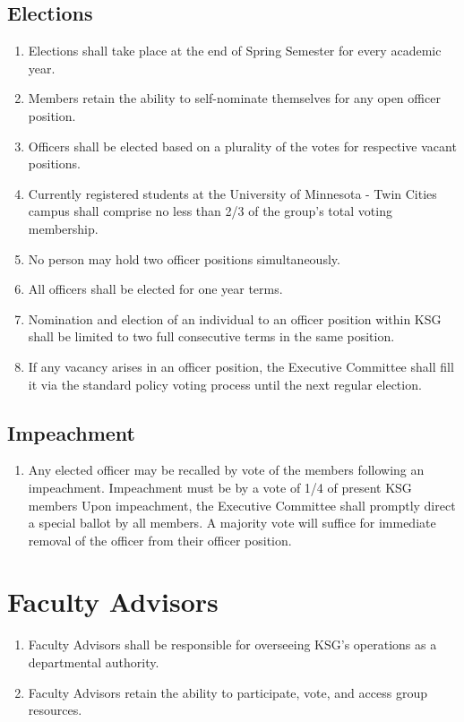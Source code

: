 \documentclass[12pt,executivepaper]{article}
\begin{document}
\subsection{Elections}
\begin{enumerate}
    \item Elections shall take place at the end of Spring Semester for every academic year.
    \item Members retain the ability to self-nominate themselves for any open officer position.
    \item Officers shall be elected based on a plurality of the votes for respective vacant
          positions.
    \item Currently registered students at the University of Minnesota - Twin Cities campus
          shall comprise no less than 2/3 of the group's total voting membership. 
    \item No person may hold two officer positions simultaneously.
    \item All officers shall be elected for one year terms.
    \item Nomination and election of an individual to an officer position within KSG shall be
          limited to two full consecutive terms in the same position.
    \item If any vacancy arises in an officer position, the Executive Committee shall fill
          it via the standard policy voting process until the next regular election.
\end{enumerate}

\subsection{Impeachment}
\begin{enumerate}
    \item Any elected officer may be recalled by vote of the members following an
          impeachment. Impeachment must be by a vote of 1/4 of present KSG members
          Upon impeachment, the Executive Committee shall promptly direct a special
          ballot by all members. A majority vote will suffice for immediate removal
          of the officer from their officer position.
\end{enumerate}

\section{Faculty Advisors}
\begin{enumerate}
    \item Faculty Advisors shall be responsible for overseeing KSG's operations as
          a departmental authority.
    \item Faculty Advisors retain the ability to participate, vote, and access group
          resources.
\end{enumerate}
\end{document}

